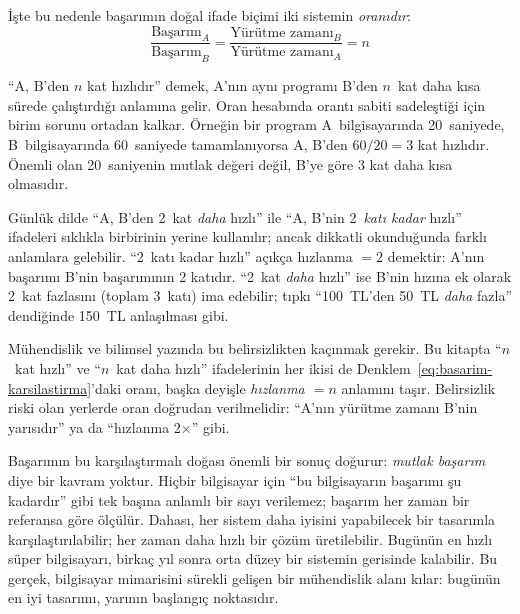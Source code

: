 İşte bu nedenle başarımın doğal ifade biçimi iki sistemin \emph{oranıdır}:
\begin{equation}
\frac{\text{Başarım}_A}{\text{Başarım}_B} = \frac{\text{Yürütme zamanı}_B}{\text{Yürütme zamanı}_A} = n
\label{eq:basarim-karsilastirma}
\end{equation}

\noindent ``A, B'den $n$ kat hızlıdır'' demek, A'nın aynı programı B'den $n$~kat daha kısa sürede çalıştırdığı anlamına gelir. Oran hesabında orantı sabiti sadeleştiği için birim sorunu ortadan kalkar. Örneğin bir program A~bilgisayarında 20~saniyede, B~bilgisayarında 60~saniyede tamamlanıyorsa A, B'den $60/20 = 3$ kat hızlıdır. Önemli olan 20~saniyenin mutlak değeri değil, B'ye göre 3 kat daha kısa olmasıdır.

\begin{bilginot}
Günlük dilde ``A, B'den 2~kat \emph{daha} hızlı'' ile ``A, B'nin 2~\emph{katı kadar} hızlı'' ifadeleri sıklıkla birbirinin yerine kullanılır; ancak dikkatli okunduğunda farklı anlamlara gelebilir. ``2~katı kadar hızlı'' açıkça hızlanma $= 2$ demektir: A'nın başarımı B'nin başarımının 2 katıdır. ``2~kat \emph{daha} hızlı'' ise B'nin hızına ek olarak 2~kat fazlasını (toplam 3~katı) ima edebilir; tıpkı ``100~TL'den 50~TL \emph{daha} fazla'' dendiğinde 150~TL anlaşılması gibi.

Mühendislik ve bilimsel yazında bu belirsizlikten kaçınmak gerekir. Bu kitapta ``$n$~kat hızlı'' ve ``$n$~kat daha hızlı'' ifadelerinin her ikisi de Denklem~\ref{eq:basarim-karsilastirma}'daki oranı, başka deyişle \emph{hızlanma $= n$} anlamını taşır. Belirsizlik riski olan yerlerde oran doğrudan verilmelidir: ``A'nın yürütme zamanı B'nin yarısıdır'' ya da ``hızlanma 2$\times$'' gibi.
\end{bilginot}

Başarımın bu karşılaştırmalı doğası önemli bir sonuç doğurur: \emph{mutlak başarım} diye bir kavram yoktur. Hiçbir bilgisayar için ``bu bilgisayarın başarımı şu kadardır'' gibi tek başına anlamlı bir sayı verilemez; başarım her zaman bir referansa göre ölçülür. Dahası, her sistem daha iyisini yapabilecek bir tasarımla karşılaştırılabilir; her zaman daha hızlı bir çözüm üretilebilir. Bugünün en hızlı süper bilgisayarı, birkaç yıl sonra orta düzey bir sistemin gerisinde kalabilir. Bu gerçek, bilgisayar mimarisini sürekli gelişen bir mühendislik alanı kılar: bugünün en iyi tasarımı, yarının başlangıç noktasıdır.

